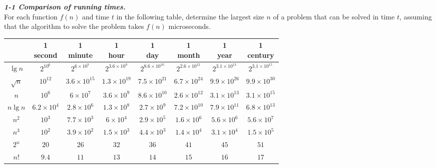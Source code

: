 \documentclass[a4paper,8pt]{article}
\begin{document}
\textbf{\textit{1-1 Comparison of running times.}}\\
For each function $f(n)$ and time $t$ in the following table, determine the
largest size $n$ of a problem that can be solved in time $t$, assuming that the
algorithm to solve the problem takes $f(n)$ microseconds.

\begin{center}
  \begin{tabular}{ *{8}{c|} }
    & \shortstack{1 \\ second} & \shortstack{1 \\ minute} & \shortstack{1 \\ hour} & \shortstack{1 \\ day} & \shortstack{1 \\ month} & \shortstack{1 \\ year} & \shortstack{1 \\ century} \\ \hline

    $\lg n$ & $2^{10^{6}}$ & $2^{6 \times 10^{7}}$ & $2^{3.6 \times 10^{9}}$ & $2^{8.6 \times 10^{10}}$ & $2^{2.6 \times 10^{12}}$ & $2^{3.1 \times 10^{13}}$ & $2^{3.1 \times 10^{15}}$ \\ \hline

    $\sqrt{n}$ & $10^{12}$ & $3.6 \times 10^{15}$ & $1.3 \times 10^{19}$ & $7.5 \times 10^{21}$ & $6.7 \times 10^{24}$ & $9.9 \times 10^{26}$ & $9.9 \times 10^{30}$ \\ \hline

    $n$ & $10^{6}$ & $6 \times 10^{7}$ & $3.6 \times 10^{9}$ & $8.6 \times 10^{10}$ & $2.6 \times 10^{12}$ & $3.1 \times 10^{13}$ & $3.1\times 10^{15}$ \\ \hline

    $n \lg n$ & $6.2 \times 10^{4}$ & $2.8 \times 10^{6}$ & $1.3 \times 10^{8}$ & $2.7 \times 10^{9}$ & $7.2 \times 10^{10}$ & $7.9 \times 10^{11}$ & $6.8 \times 10^{13}$ \\ \hline

    $n^{2}$ & $10^{3}$ & $7.7 \times 10^{3}$ & $6 \times 10^{4}$ & $2.9 \times 10^{5}$ & $1.6 \times 10^{6}$ & $5.6 \times 10^{6}$ & $5.6 \times 10^{7}$ \\ \hline

    $n^{3}$ & $10^{2}$ & $3.9 \times 10^{2}$ & $1.5 \times 10^{3}$ & $4.4 \times 10^{3}$ & $1.4 \times 10^{4}$ & $3.1 \times 10^{4}$ & $1.5 \times 10^{5}$ \\ \hline

    $2^{n}$ & $20$ & $26$ & $32$ & $36$ & $41$ & $45$ & $51$ \\ \hline

    $n!$ & $9.4$ & $11$ & $13$ & $14$ & $15$ & $16$ & $17$ \\ \hline
  \end{tabular}
\end{center}
\end{document}
